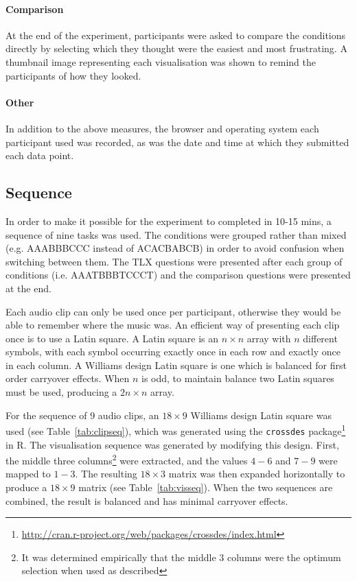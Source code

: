 \paragraph{Comparison}
At the end of the experiment, participants were asked to compare the conditions
directly by selecting which they thought were the easiest and most frustrating.
A thumbnail image representing each visualisation was shown to remind the
participants of how they looked.

\paragraph{Other}
In addition to the above measures, the browser and operating system each
participant used was recorded, as was the date and time at which they
submitted each data point.

\subsection{Sequence}\label{sec:studysequence}
In order to make it possible for the experiment to completed in 10-15 mins, a
sequence of nine tasks was used. The conditions were grouped rather than mixed
(e.g. AAABBBCCC instead of ACACBABCB) in order to avoid confusion when
switching between them. The TLX questions were presented after each group of
conditions (i.e. AAATBBBTCCCT) and the comparison questions were presented at
the end.

Each audio clip can only be used once per participant, otherwise they would be
able to remember where the music was. An efficient way of presenting each clip
once is to use a Latin square. A Latin square is an $n \times n$ array with $n$
different symbols, with each symbol occurring exactly once in each row and
exactly once in each column. A Williams design Latin square \cite{Williams1949}
is one which is balanced for first order carryover effects.  When $n$ is odd,
to maintain balance two Latin squares must be used, producing a $2n \times n$
array.

For the sequence of 9 audio clips, an $18\times9$ Williams design Latin square
was used (see Table~\ref{tab:clipseq}), which was generated using the
\texttt{crossdes}
package\footnote{\url{http://cran.r-project.org/web/packages/crossdes/index.html}}
in R. The visualisation sequence was generated by modifying this design. First,
the middle three columns\footnote{It was determined empirically that the
  middle 3 columns were the optimum selection when used as described} were
extracted, and the values $4-6$ and $7-9$ were mapped to $1-3$. The resulting
$18\times3$ matrix was then expanded horizontally to produce a $18\times9$
matrix (see Table~\ref{tab:visseq}). When the two sequences are combined, the
result is balanced and has minimal carryover effects.

